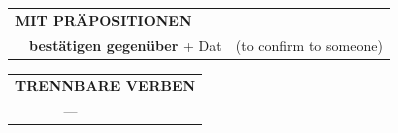 \documentclass[10pt,a4paper]{revtex4-2}
\begin{document}
\begin{verbbox-acc}
\vspace{10pt}

\begin{tabular}{lll}
\multicolumn{3}{l}{\textbf{MIT PRÄPOSITIONEN}}\\
& \textbf{bestätigen gegenüber} + Dat & (to confirm to someone)\\
\end{tabular}
\hfill
\begin{tabular}{lll}
\multicolumn{3}{l}{\textbf{TRENNBARE VERBEN}}\\
& ---\\
\end{tabular}

\vspace{-5pt}
\end{verbbox-acc}

\end{document}
